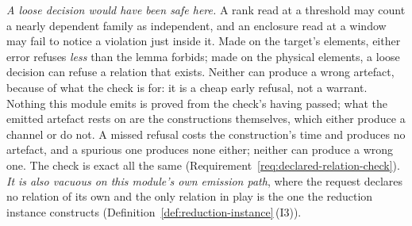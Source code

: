 \begin{remark}
\emph{A loose decision would have been safe here.} A rank read at a threshold
may count a nearly dependent family as independent, and an enclosure read at
a window may fail to notice a violation just inside it. Made on the target's
elements, either error refuses \emph{less} than the lemma forbids; made on the
physical elements, a loose decision can refuse a relation that exists.
Neither can produce a wrong artefact, because of what the check is for: it
is a cheap early refusal, not a warrant. Nothing this module emits is
proved from the check's having passed; what the emitted artefact rests on are
the constructions themselves, which either produce a channel or do not. A
missed refusal costs the construction's time and produces no artefact, and a
spurious one produces none either; neither can produce a wrong one. The check is exact all the same
(Requirement~\ref{req:declared-relation-check}). \emph{It is also vacuous on
this module's own emission path}, where the request declares no relation of
its own and the only relation in play is the one the reduction instance
constructs (Definition~\ref{def:reduction-instance}\,(I3)).
\end{remark}
